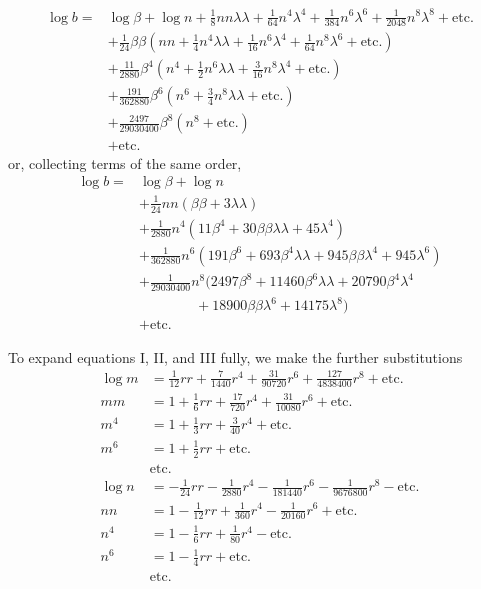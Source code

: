 \[
\begin{aligned}
\log b={}&\log\beta+\log n+\tfrac18nn\lambda\lambda+\tfrac1{64}n^4\lambda^4+\tfrac1{384}n^6\lambda^6+\tfrac1{2048}n^8\lambda^8+\text{etc.}\\
&+\tfrac1{24}\beta\beta(nn+\tfrac14n^4\lambda\lambda+\tfrac1{16}n^6\lambda^4+\tfrac1{64}n^8\lambda^6+\text{etc.})\\
&+\tfrac{11}{2880}\beta^4(n^4+\tfrac12n^6\lambda\lambda+\tfrac3{16}n^8\lambda^4+\text{etc.})\\
&+\tfrac{191}{362880}\beta^6(n^6+\tfrac34n^8\lambda\lambda+\text{etc.})\\
&+\tfrac{2497}{29030400}\beta^8(n^8+\text{etc.})\\
&+\text{etc.}
\end{aligned}
\]
or, collecting terms of the same order,
\[
\begin{aligned}
\log b={}&\log\beta+\log n\\
&+\tfrac1{24}nn(\beta\beta+3\lambda\lambda)\\
&+\tfrac1{2880}n^4(11\beta^4+30\beta\beta\lambda\lambda+45\lambda^4)\\
&+\tfrac1{362880}n^6(191\beta^6+693\beta^4\lambda\lambda+945\beta\beta\lambda^4+945\lambda^6)\\
&+\tfrac1{29030400}n^8(2497\beta^8+11460\beta^6\lambda\lambda+20790\beta^4\lambda^4\\
&\qquad\qquad+18900\beta\beta\lambda^6+14175\lambda^8)\\
&+\text{etc.}
\end{aligned}
\]

\indent To expand equations I, II, and III fully, we make the further substitutions
\[
\begin{aligned}
\log m&=\tfrac1{12}rr+\tfrac7{1440}r^4+\tfrac{31}{90720}r^6+\tfrac{127}{4838400}r^8+\text{etc.}\\
mm&=1+\tfrac16rr+\tfrac{17}{720}r^4+\tfrac{31}{10080}r^6+\text{etc.}\\
m^4&=1+\tfrac13rr+\tfrac3{40}r^4+\text{etc.}\\
m^6&=1+\tfrac12rr+\text{etc.}\\
&\text{etc.}\\
\log n&=-\tfrac1{24}rr-\tfrac1{2880}r^4-\tfrac1{181440}r^6-\tfrac1{9676800}r^8-\text{etc.}\\
nn&=1-\tfrac1{12}rr+\tfrac1{360}r^4-\tfrac1{20160}r^6+\text{etc.}\\
n^4&=1-\tfrac16rr+\tfrac1{80}r^4-\text{etc.}\\
n^6&=1-\tfrac14rr+\text{etc.}\\
&\text{etc.}
\end{aligned}
\]


